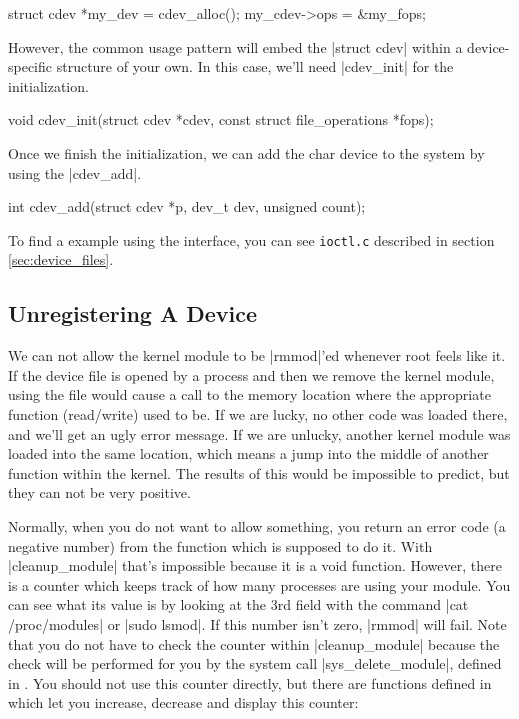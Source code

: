 \documentclass[10pt, oneside]{book}
\begin{document}
\begin{code}
struct cdev *my_dev = cdev_alloc();
my_cdev->ops = &my_fops;
\end{code}

However, the common usage pattern will embed the \cpp|struct cdev| within a device-specific structure of your own.
In this case, we'll need \cpp|cdev_init| for the initialization.

\begin{code}
void cdev_init(struct cdev *cdev, const struct file_operations *fops);
\end{code}

Once we finish the initialization, we can add the char device to the system by using the \cpp|cdev_add|.

\begin{code}
int cdev_add(struct cdev *p, dev_t dev, unsigned count);
\end{code}

To find a example using the interface, you can see \verb|ioctl.c| described in section \ref{sec:device_files}.

\subsection{Unregistering A Device}
\label{sec:unregister_device}
We can not allow the kernel module to be \sh|rmmod|'ed whenever root feels like it.
If the device file is opened by a process and then we remove the kernel module, using the file would cause a call to the memory location where the appropriate function (read/write) used to be.
If we are lucky, no other code was loaded there, and we'll get an ugly error message.
If we are unlucky, another kernel module was loaded into the same location, which means a jump into the middle of another function within the kernel.
The results of this would be impossible to predict, but they can not be very positive.

Normally, when you do not want to allow something, you return an error code (a negative number) from the function which is supposed to do it.
With \cpp|cleanup_module| that's impossible because it is a void function.
However, there is a counter which keeps track of how many processes are using your module.
You can see what its value is by looking at the 3rd field with the command \sh|cat /proc/modules| or \sh|sudo lsmod|.
If this number isn't zero, \sh|rmmod| will fail.
Note that you do not have to check the counter within \cpp|cleanup_module| because the check will be performed for you by the system call \cpp|sys_delete_module|, defined in .
You should not use this counter directly, but there are functions defined in  which let you increase, decrease and display this counter:
\end{document}
